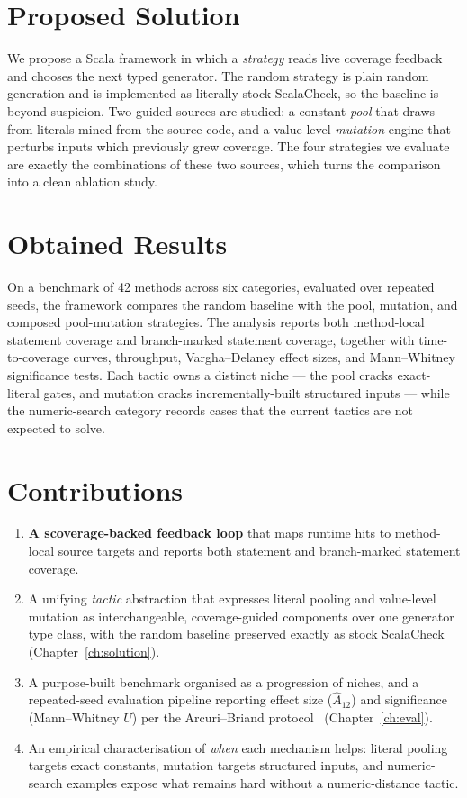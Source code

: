 \documentclass[11pt,a4paper]{report}
\begin{document}
\section{Proposed Solution}
\label{sec:proposed-intro}

We propose a Scala framework in which a \emph{strategy} reads live coverage feedback and chooses the next
typed generator. The random strategy is plain random generation and is implemented as literally stock
ScalaCheck, so the baseline is beyond suspicion. Two guided sources are studied: a constant \emph{pool} that
draws from literals mined from the source code, and a value-level \emph{mutation} engine that perturbs inputs
which previously grew coverage. The four strategies we evaluate are exactly the combinations of these two
sources, which turns the comparison into a clean ablation study.

\section{Obtained Results}
\label{sec:results-intro}

On a benchmark of 42 methods across six categories, evaluated over repeated seeds, the framework compares
the random baseline with the pool, mutation, and composed pool-mutation strategies. The analysis reports
both method-local statement coverage and branch-marked statement coverage, together with time-to-coverage
curves, throughput, Vargha--Delaney effect sizes, and Mann--Whitney significance tests. Each tactic owns a
distinct niche — the pool cracks exact-literal gates, and mutation cracks incrementally-built structured
inputs — while the numeric-search category records cases that the current tactics are not expected to solve.

\section{Contributions}
\label{sec:contributions}

\begin{enumerate}[leftmargin=1.6em]
  \item \textbf{A scoverage-backed feedback loop} that maps runtime hits to method-local source targets and reports both statement and branch-marked statement coverage.
  \item A unifying \emph{tactic} abstraction that expresses literal pooling and value-level mutation as interchangeable, coverage-guided components over one generator type class, with the random baseline preserved exactly as stock ScalaCheck (Chapter~\ref{ch:solution}).
  \item A purpose-built benchmark organised as a progression of niches, and a repeated-seed evaluation pipeline reporting effect size ($\hat{A}_{12}$) and significance (Mann--Whitney $U$) per the Arcuri--Briand protocol~\cite{arcuri2014} (Chapter~\ref{ch:eval}).
  \item An empirical characterisation of \emph{when} each mechanism helps: literal pooling targets exact constants, mutation targets structured inputs, and numeric-search examples expose what remains hard without a numeric-distance tactic.
\end{enumerate}
\end{document}
